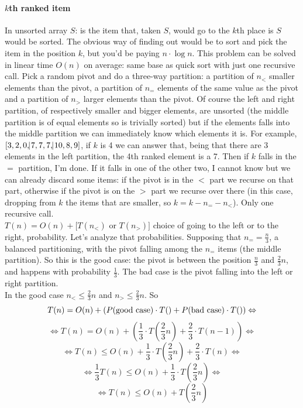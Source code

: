 \documentclass[10pt]{report}
\begin{document}
\paragraph{$k$th ranked item} In unsorted array $S$: is the item that, taken $S$, would go to the $k$th place is $S$ would be sorted. The obvious way of finding out would be to sort and pick the item in the position $k$, but you'd be paying $n\cdot\log n$. This problem can be solved in linear time $O(n)$ on average: same base as quick sort with just one recursive call. Pick a random pivot and do a three-way partition: a partition of $n_<$ smaller elements than the pivot, a partition of $n_=$ elements of the same value as the pivot and a partition of $n_>$ larger elements than the pivot. Of course the left and right partition, of respectively smaller and bigger elements, are unsorted (the middle partition is of equal elements so is trivially sorted) but if the elements falls into the middle partition we can immediately know which elements it is. For example, $[3,2,0,\vline7,7,7,\vline10,8,9]$, if $k$ is 4 we can answer that, being that there are $3$ elements in the left partition, the 4th ranked element is a 7. Then if $k$ falls in the $=$ partition, I'm done. If it falls in one of the other two, I cannot know but we can already discard some items: if the pivot is in the $<$ part we recurse on that part, otherwise if the pivot is on the $>$ part we recurse over there (in this case, dropping from $k$ the items that are smaller, so $k = k - n_= - n_<$). Only one recursive call.\\
$T(n) = O(n) + [T(n_<)$ or $T(n_>)]$ choice of going to the left or to the right, probability. Let's analyze that probabilities. Supposing that $n_= = \frac{n}{3}$, a balanced partitioning, with the pivot falling among the $n_=$ items (the middle partition). So this is the good case: the pivot is between the position $\frac{n}{3}$ and $\frac{2}{3}n$, and happens with probability $\frac{1}{3}$. The bad case is the pivot falling into the left or right partition.\\
In the good case $n_< \leq \frac{2}{3}n$ and $n_> \leq 	\frac{2}{3}n$. So $$T(n) = O(n) + (P(\hbox{good case})\cdot T() + P(\hbox{bad case})\cdot T()) \Leftrightarrow$$
$$\Leftrightarrow T(n) = O(n) + \left(\frac{1}{3}\cdot T\left(\frac{2}{3}n\right) + \frac{2}{3}\cdot T(n - 1)\right) \Leftrightarrow$$
$$\Leftrightarrow T(n) \leq O(n) + \frac{1}{3}\cdot T\left(\frac{2}{3}n\right) + \frac{2}{3}\cdot T(n) \Leftrightarrow$$
$$\Leftrightarrow \frac{1}{3}T(n) \leq O(n) + \frac{1}{3}\cdot T\left(\frac{2}{3}n\right) \Leftrightarrow$$
$$\Leftrightarrow T(n) \leq O(n) + T\left(\frac{2}{3}n\right)$$
\end{document}

